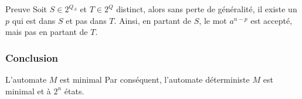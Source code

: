 \begin{frame}{\myframetitle}
  \begin{block}{Preuve}
    Soit \(S \in 2^{Q_A}\) et \(T \in 2^{Q}\) distinct, alors sans perte de
    généralité, il existe un \(p\) qui est dans \(S\) et pas dans \(T\). Ainsi,
    en partant de \(S\), le mot \(a^{n - p}\) est accepté, mais pas en partant
    de \(T\).
  \end{block}
\end{frame}

\subsubsection{Conclusion}

\begin{frame}{\myframetitle}
  \begin{block}{L'automate \(M\) est minimal}
    Par conséquent, l'automate déterministe \(M\) est minimal et à \(2^n\)
    états.
  \end{block}
\end{frame}